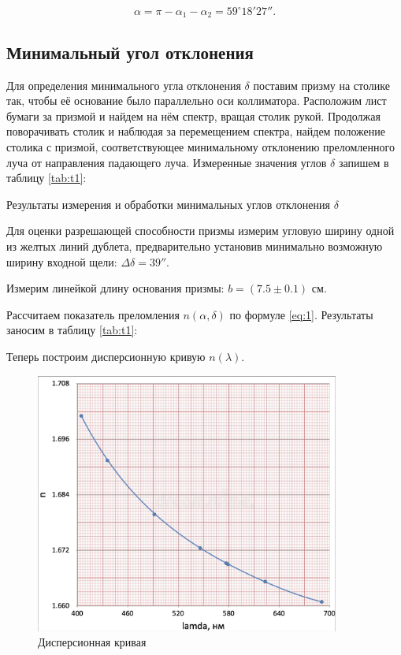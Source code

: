 \documentclass[12pt,a4paper]{article}
\begin{document}
	$$\alpha = \pi - \alpha_1 - \alpha_2 = 59^\circ 18'27''.$$

	\subsection*{Минимальный угол отклонения}

	Для определения минимального угла отклонения $\delta$ поставим призму на столике так, чтобы её основание было параллельно оси коллиматора. Расположим лист бумаги за призмой и найдем на нём спектр, вращая столик рукой. Продолжая поворачивать столик и наблюдая за перемещением спектра, найдем положение столика с призмой, соответствующее минимальному отклонению преломленного луча от направления падающего луча. Измеренные значения углов $\delta$ запишем в таблицу \ref{tab:t1}:
	
    \begin{table}[H]
	   \centering
	   \footnotesize
	   
	   \caption{Результаты измерения и обработки минимальных углов отклонения $\delta$}
	   \label{tab:t1}
    \end{table}

	Для оценки разрешающей способности призмы измерим угловую ширину одной из желтых линий дублета, предварительно установив минимально возможную ширину входной щели: $\Delta \delta = 39''$. 
	
	Измерим линейкой длину основания призмы: $b = (7.5 \pm 0.1)$ см.
	
    Рассчитаем показатель преломления $n(\alpha, \delta)$ по формуле \ref{eq:1}. Результаты заносим в таблицу \ref{tab:t1}:

	Теперь построим дисперсионную кривую $n(\lambda)$.
    \begin{figure}[H]
    	\centering
    	\includegraphics[width=10cm]{src/n_lambda.png}
    	\caption{Дисперсионная кривая}
    	\label{fig:disp}
    \end{figure}
	
\end{document}
